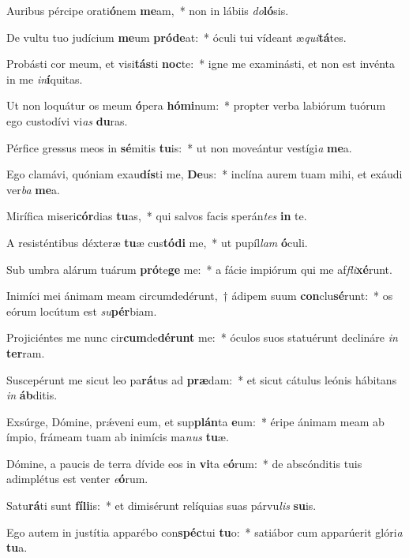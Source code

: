 \item Auribus pércipe orati\textbf{ó}nem \textbf{me}am,~* non in lábiis \textit{do}\textbf{ló}sis.
\item De vultu tuo judícium \textbf{me}um \textbf{pród}\textbf{e}at:~* óculi tui vídeant æ\textit{qui}\textbf{tá}tes.
\item Probásti cor meum, et visi\textbf{tás}ti \textbf{noc}te:~* igne me examinásti, et non est invénta in me \textit{in}\textbf{í}quitas.
\item Ut non loquátur os meum \textbf{ó}pera \textbf{hó}\textbf{mi}num:~* propter verba labiórum tuórum ego custodívi vi\textit{as} \textbf{du}ras.
\item Pérfice gressus meos in \textbf{sé}mitis \textbf{tu}is:~* ut non moveántur vestígi\textit{a} \textbf{me}a.
\item Ego clamávi, quóniam exau\textbf{dís}ti me, \textbf{De}us:~* inclína aurem tuam mihi, et exáudi ver\textit{ba} \textbf{me}a.
\item Mirífica miseri\textbf{cór}dias \textbf{tu}as,~* qui salvos facis sperán\textit{tes} \textbf{in} te.
\item A resisténtibus déxteræ \textbf{tu}æ cus\textbf{tó}\textbf{di} me,~* ut pupíl\textit{lam} \textbf{ó}culi.
\item Sub umbra alárum tuárum \textbf{pró}te\textbf{ge} me:~* a fácie impiórum qui me af\textit{fli}\textbf{xé}runt.
\item Inimíci mei ánimam meam circumdedérunt,~† ádipem suum \textbf{con}clu\textbf{sé}runt:~* os eórum locútum est \textit{su}\textbf{pér}biam.
\item Projiciéntes me nunc cir\textbf{cum}de\textbf{dé}\textbf{runt} me:~* óculos suos statuérunt declináre \textit{in} \textbf{ter}ram.
\item Suscepérunt me sicut leo pa\textbf{rá}tus ad \textbf{præ}dam:~* et sicut cátulus leónis hábitans \textit{in} \textbf{áb}ditis.
\item Exsúrge, Dómine, prǽveni eum, et sup\textbf{plán}ta \textbf{e}um:~* éripe ánimam meam ab ímpio, frámeam tuam ab inimícis ma\textit{nus} \textbf{tu}æ.
\item Dómine, a paucis de terra dívide eos in \textbf{vi}ta e\textbf{ó}rum:~* de abscónditis tuis adimplétus est venter \textit{e}\textbf{ó}rum.
\item Satu\textbf{rá}ti sunt \textbf{fí}\textbf{li}is:~* et dimisérunt relíquias suas párvu\textit{lis} \textbf{su}is.
\item Ego autem in justítia apparébo con\textbf{spéc}tui \textbf{tu}o:~* satiábor cum apparúerit glóri\textit{a} \textbf{tu}a.
